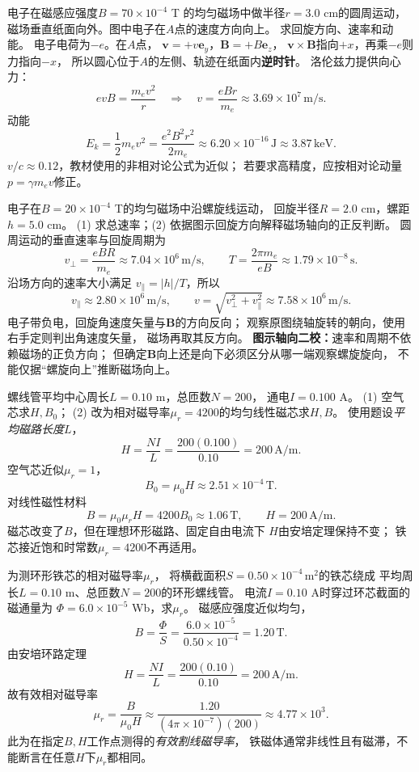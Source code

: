 \problemtext 电子在磁感应强度$B=70\times10^{-4}$ T
的均匀磁场中做半径$r=3.0$ cm的圆周运动，
磁场垂直纸面向外。图中电子在$A$点的速度方向向上。
求回旋方向、速率和动能。
\workings
电子电荷为$-e$。在$A$点，
$\bm v=+v\bm e_y$，$\bm B=+B\bm e_z$，
$\bm v\times\bm B$指向$+x$，再乘$-e$则力指向$-x$，
所以圆心位于$A$的左侧、轨迹在纸面内\textbf{逆时针}。
洛伦兹力提供向心力：
\[
evB=\frac{m_ev^2}{r}
\quad\Longrightarrow\quad
\boxed{v=\frac{eBr}{m_e}
\approx3.69\times10^7\,\mathrm{m/s}}.
\]
动能
\[
\boxed{E_k=\frac12m_ev^2
=\frac{e^2B^2r^2}{2m_e}
\approx6.20\times10^{-16}\,\mathrm J
\approx3.87\,\mathrm{keV}}.
\]
\crosscheck $v/c\approx0.12$，教材使用的非相对论公式为近似；
若要求高精度，应按相对论动量$p=\gamma m_ev$修正。

\problemtext 电子在$B=20\times10^{-4}$ T的均匀磁场中沿螺旋线运动，
回旋半径$R=2.0$ cm，螺距$h=5.0$ cm。
(1) 求总速率；(2) 依据图示回旋方向解释磁场轴向的正反判断。
\workings
圆周运动的垂直速率与回旋周期为
\[
v_\perp=\frac{eBR}{m_e}
\approx7.04\times10^6\,\mathrm{m/s},
\qquad
T=\frac{2\pi m_e}{eB}
\approx1.79\times10^{-8}\,\mathrm s.
\]
沿场方向的速率大小满足
$v_\parallel=|h|/T$，所以
\[
v_\parallel\approx2.80\times10^6\,\mathrm{m/s},
\qquad
\boxed{v=\sqrt{v_\perp^2+v_\parallel^2}
\approx7.58\times10^6\,\mathrm{m/s}}.
\]
电子带负电，回旋角速度矢量与$\bm B$的方向反向；
观察原图绕轴旋转的朝向，使用右手定则判出角速度矢量，
磁场再取其反方向。
\crosscheck \textbf{图示轴向二校：}速率和周期不依赖磁场的正负方向；
但确定$\bm B$向上还是向下必须区分从哪一端观察螺旋旋向，
不能仅据“螺旋向上”推断磁场向上。

\problemtext 螺线管平均中心周长$L=0.10$ m，总匝数$N=200$，
通电$I=0.100$ A。
(1) 空气芯求$H,B_0$；
(2) 改为相对磁导率$\mu_r=4200$的均匀线性磁芯求$H,B$。
\workings
使用题设\emph{平均磁路长度}$L$，
\[
\boxed{H=\frac{NI}{L}
=\frac{200(0.100)}{0.10}
=200\,\mathrm{A/m}}.
\]
空气芯近似$\mu_r=1$，
\[
\boxed{B_0=\mu_0H\approx2.51\times10^{-4}\,\mathrm T}.
\]
对线性磁性材料
\[
\boxed{B=\mu_0\mu_rH
=4200B_0\approx1.06\,\mathrm T},\qquad
\boxed{H=200\,\mathrm{A/m}}.
\]
\crosscheck 磁芯改变了$B$，但在理想环形磁路、固定自由电流下
$H$由安培定理保持不变；
铁芯接近饱和时常数$\mu_r=4200$不再适用。

\problemtext 为测环形铁芯的相对磁导率$\mu_r$，
将横截面积$S=0.50\times10^{-4}\,\mathrm{m^2}$的铁芯绕成
平均周长$L=0.10$ m、总匝数$N=200$的环形螺线管。
电流$I=0.10$ A时穿过环芯截面的磁通量为
$\Phi=6.0\times10^{-5}$ Wb，求$\mu_r$。
\workings
磁感应强度近似均匀，
\[
\boxed{B=\frac{\Phi}{S}
=\frac{6.0\times10^{-5}}{0.50\times10^{-4}}
=1.20\,\mathrm T}.
\]
由安培环路定理
\[
\boxed{H=\frac{NI}{L}
=\frac{200(0.10)}{0.10}
=200\,\mathrm{A/m}}.
\]
故有效相对磁导率
\[
\boxed{\mu_r=\frac{B}{\mu_0H}
\approx\frac{1.20}{(4\pi\times10^{-7})(200)}
\approx4.77\times10^3}.
\]
\crosscheck 此为在指定$B,H$工作点测得的\emph{有效割线磁导率}，
铁磁体通常非线性且有磁滞，不能断言在任意$H$下$\mu_r$都相同。
